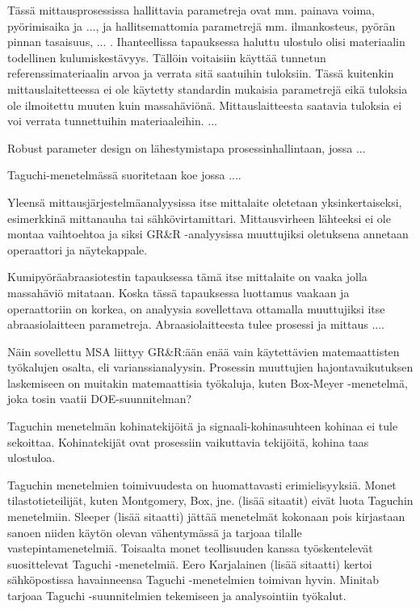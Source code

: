 \documentclass[12pt,a4paper,finnish]{tutthesis}
\begin{document}
Tässä mittausprosessissa hallittavia parametreja ovat mm. painava
voima, pyörimisaika ja ..., ja hallitsemattomia parametrejä mm.
ilmankosteus, pyörän pinnan tasaisuus, ... . Ihanteellissa tapauksessa
haluttu ulostulo olisi materiaalin todellinen kulumiskestävyys.
Tällöin voitaisiin käyttää tunnetun referenssimateriaalin arvoa ja
verrata sitä saatuihin tuloksiin.
Tässä kuitenkin mittauslaitetteessa ei ole käytetty standardin mukaisia
parametrejä eikä tuloksia ole ilmoitettu muuten kuin massahäviönä.
Mittauslaitteesta saatavia tuloksia ei voi verrata tunnettuihin
materiaaleihin. ...

Robust parameter design on lähestymistapa prosessinhallintaan, jossa ...

Taguchi-menetelmässä suoritetaan koe jossa ....


Yleensä mittausjärjestelmäanalyysissa itse mittalaite oletetaan
yksinkertaiseksi, esimerkkinä mittanauha tai sähkövirtamittari.
Mittausvirheen lähteeksi ei ole montaa vaihtoehtoa ja siksi GR\&R -analyysissa
muuttujiksi oletuksena annetaan operaattori ja näytekappale.

Kumipyöräabraasiotestin tapauksessa tämä itse mittalaite on vaaka jolla
massahäviö mitataan. Koska tässä tapauksessa luottamus vaakaan ja operaattoriin
on korkea, on analyysia sovellettava ottamalla muuttujiksi itse
abraasiolaitteen parametreja. Abraasiolaitteesta tulee prosessi ja mittaus
....

Näin sovellettu MSA liittyy GR\&R:ään enää vain käytettävien matemaattisten
työkalujen osalta, eli varianssianalyysin. Prosessin muuttujien
hajontavaikutuksen laskemiseen on muitakin matemaattisia työkaluja,
kuten Box-Meyer -menetelmä, joka tosin vaatii DOE-suunnitelman?


Taguchin menetelmän kohinatekijöitä ja signaali-kohinasuhteen kohinaa
ei tule sekoittaa. Kohinatekijät ovat prosessiin vaikuttavia tekijöitä,
kohina taas ulostuloa.


Taguchin menetelmien toimivuudesta on huomattavasti erimielisyyksiä. Monet
tilastotieteilijät, kuten Montgomery, Box, jne. (lisää sitaatit) eivät luota
Taguchin menetelmiin. Sleeper (lisää sitaatti) jättää menetelmät kokonaan
pois kirjastaan sanoen niiden käytön olevan vähentymässä ja tarjoaa tilalle
vastepintamenetelmiä. Toisaalta monet teollisuuden kanssa työskentelevät
suosittelevat Taguchi -menetelmiä. Eero Karjalainen (lisää sitaatti) kertoi
sähköpostissa havainneensa Taguchi -menetelmien toimivan hyvin. Minitab
tarjoaa Taguchi -suunnitelmien tekemiseen ja analysointiin työkalut.
\end{document}
